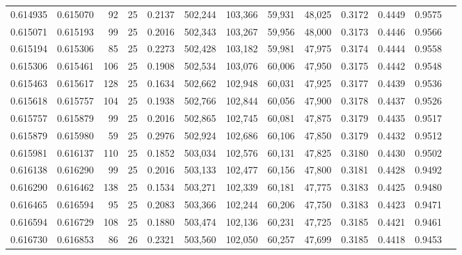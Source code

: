 \begin{tabular}{rrrrrrrrrrrrr}
0.614935 & 0.615070 &    92 &  25 &                                     0.2137 & 502,244 & 103,366 &  59,931 &  48,025 & 0.3172 & 0.4449 & 0.9575 \\
0.615071 & 0.615193 &    99 &  25 &                                     0.2016 & 502,343 & 103,267 &  59,956 &  48,000 & 0.3173 & 0.4446 & 0.9566 \\
0.615194 & 0.615306 &    85 &  25 &                                     0.2273 & 502,428 & 103,182 &  59,981 &  47,975 & 0.3174 & 0.4444 & 0.9558 \\
0.615306 & 0.615461 &   106 &  25 &                                     0.1908 & 502,534 & 103,076 &  60,006 &  47,950 & 0.3175 & 0.4442 & 0.9548 \\
0.615463 & 0.615617 &   128 &  25 &                                     0.1634 & 502,662 & 102,948 &  60,031 &  47,925 & 0.3177 & 0.4439 & 0.9536 \\
0.615618 & 0.615757 &   104 &  25 &                                     0.1938 & 502,766 & 102,844 &  60,056 &  47,900 & 0.3178 & 0.4437 & 0.9526 \\
0.615757 & 0.615879 &    99 &  25 &                                     0.2016 & 502,865 & 102,745 &  60,081 &  47,875 & 0.3179 & 0.4435 & 0.9517 \\
0.615879 & 0.615980 &    59 &  25 &                                     0.2976 & 502,924 & 102,686 &  60,106 &  47,850 & 0.3179 & 0.4432 & 0.9512 \\
0.615981 & 0.616137 &   110 &  25 &                                     0.1852 & 503,034 & 102,576 &  60,131 &  47,825 & 0.3180 & 0.4430 & 0.9502 \\
0.616138 & 0.616290 &    99 &  25 &                                     0.2016 & 503,133 & 102,477 &  60,156 &  47,800 & 0.3181 & 0.4428 & 0.9492 \\
0.616290 & 0.616462 &   138 &  25 &                                     0.1534 & 503,271 & 102,339 &  60,181 &  47,775 & 0.3183 & 0.4425 & 0.9480 \\
0.616465 & 0.616594 &    95 &  25 &                                     0.2083 & 503,366 & 102,244 &  60,206 &  47,750 & 0.3183 & 0.4423 & 0.9471 \\
0.616594 & 0.616729 &   108 &  25 &                                     0.1880 & 503,474 & 102,136 &  60,231 &  47,725 & 0.3185 & 0.4421 & 0.9461 \\
0.616730 & 0.616853 &    86 &  26 &                                     0.2321 & 503,560 & 102,050 &  60,257 &  47,699 & 0.3185 & 0.4418 & 0.9453 \\

\end{tabular}
